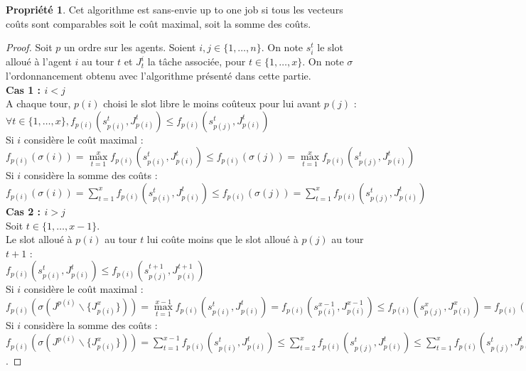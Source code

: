 \documentclass[12pt]{article}
\theoremstyle{definition}
\newtheorem{prop}{Propriété}
\begin{document}
\begin{prop}
Cet algorithme est sans-envie up to one job si tous les vecteurs coûts sont comparables soit le coût maximal, soit la somme des coûts.
\end{prop}

\begin{proof}
Soit $p$ un ordre sur les agents. Soient $i, j \in \{1, \dots, n\}$. On note $s_i^t$ le slot alloué à l'agent $i$ au tour $t$ et $J^i_t$ la tâche associée, pour $t\in\{1,\dots,x\}$. On note $\sigma$ l'ordonnancement obtenu avec l'algorithme présenté dans cette partie.\\
\textbf{Cas 1 : $i<j$}\\
A chaque tour, $p(i)$ choisi le slot libre le moins coûteux pour lui avant $p(j)$ :\\
 $\forall t\in \{1, \dots, x\}, f_{p(i)}(s^t_{p(i)}, J^t_{p(i)})\leq f_{p(i)}(s^t_{p(j)}, J^t_{p(i)})$\\
 Si $i$ considère le coût maximal : $f_{p(i)}(\sigma(i)) = \max\limits_{t = 1}^x f_{p(i)}(s^t_{p(i)}, J^t_{p(i)}) \leq f_{p(i)}(\sigma(j)) = \max\limits_{t = 1}^x f_{p(i)}(s^t_{p(j)}, J^t_{p(i)})$\\
 Si $i$ considère la somme des coûts : $f_{p(i)}(\sigma(i)) = \sum\limits_{t = 1}^x f_{p(i)}(s^t_{p(i)}, J^t_{p(i)})\leq f_{p(i)}(\sigma(j)) = \sum\limits_{t = 1}^x f_{p(i)}(s^t_{p(j)}, J^t_{p(i)})$\\
\textbf{Cas 2 : $i>j$}\\
Soit $t\in\{1,\dots,x-1\}$.\\
Le slot alloué à $p(i)$ au tour $t$ lui coûte moins que le slot alloué à $p(j)$ au tour $t+1$ : \\
$f_{p(i)}(s^t_{p(i)}, J^t_{p(i)})\leq f_{p(i)}(s^{t+1}_{p(j)}, J^{t+1}_{p(i)})$\\
Si $i$ considère le coût maximal : \\
$f_{p(i)}(\sigma(J^{p(i)}\backslash\{J_{p(i)}^x\})) = \max\limits_{t = 1}^{x-1} f_{p(i)}(s^t_{p(i)}, J^t_{p(i)}) = f_{p(i)}(s^{x-1}_{p(i)}, J^{x-1}_{p(i)}) \leq f_{p(i)}(s^x_{p(j)}, J^x_{p(i)}) = f_{p(i)}(\sigma(j))$\\
Si $i$ considère la somme des coûts : \\
$f_{p(i)}(\sigma(J^{p(i)}\backslash\{J_{p(i)}^x\})) = \sum\limits_{t = 1}^{x-1} f_{p(i)}(s^t_{p(i)}, J^t_{p(i)}) \leq \sum\limits_{t = 2}^{x} f_{p(i)}(s^t_{p(j)}, J^t_{p(i)}) \leq \sum\limits_{t = 1}^{x} f_{p(i)}(s^t_{p(j)}, J^t_{p(i)}) = f_{p(i)}(\sigma(j))$.
\end{proof}
\end{document}
